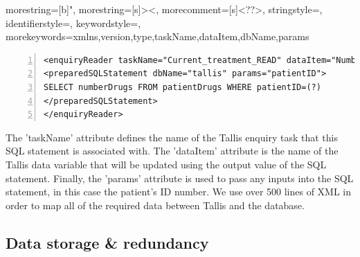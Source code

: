 \documentclass[11pt]{article}
\begin{document}
{
  morestring=[b]",
  morestring=[s]{>}{<},
  morecomment=[s]{<?}{?>},
  stringstyle=\color{black},
  identifierstyle=\color{darkblue},
  keywordstyle=\color{cyan},
  morekeywords={xmlns,version,type,taskName,dataItem,dbName,params}
}

\lstset{
  language        = xml,
  basicstyle      = \small\ttfamily
}  

\renewcommand{\lstlistingname}{Code box}
\begin{lstlisting}[float=ht,numbers=left,frame=lines,caption="Example enquiryReader element",label=xmlenquiryreader,showstringspaces=false]
<enquiryReader taskName="Current_treatment_READ" dataItem="Number_of_drugs">
<preparedSQLStatement dbName="tallis" params="patientID">
SELECT numberDrugs FROM patientDrugs WHERE patientID=(?)
</preparedSQLStatement>
</enquiryReader>
\end{lstlisting}


The 'taskName' attribute defines the name of the Tallis enquiry task that this SQL statement is associated with. The 'dataItem' attribute is the name of the Tallis data variable that will be updated using the output value of the SQL statement. Finally, the 'params' attribute is used to pass any inputs into the SQL statement, in this case the patient's ID number. We use over 500 lines of XML in order to map all of the required data between Tallis and the database.

\subsection{Data storage \& redundancy}
\end{document}
